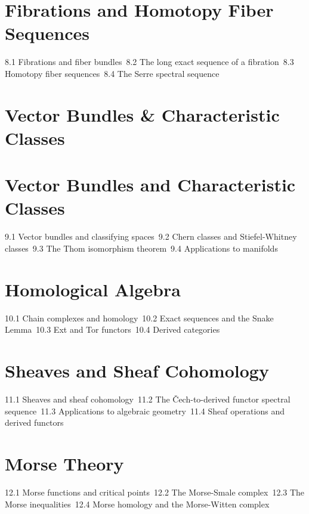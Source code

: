 \section{Fibrations and Homotopy Fiber Sequences}
8.1 Fibrations and fiber bundles\
8.2 The long exact sequence of a fibration\
8.3 Homotopy fiber sequences\
8.4 The Serre spectral sequence\
\section{Vector Bundles \& Characteristic Classes}
\section{Vector Bundles and Characteristic Classes}
9.1 Vector bundles and classifying spaces\
9.2 Chern classes and Stiefel-Whitney classes\
9.3 The Thom isomorphism theorem\
9.4 Applications to manifolds\
\section{Homological Algebra}
10.1 Chain complexes and homology\
10.2 Exact sequences and the Snake Lemma\
10.3 Ext and Tor functors\
10.4 Derived categories\
\section{Sheaves and Sheaf Cohomology}
11.1 Sheaves and sheaf cohomology\
11.2 The Čech-to-derived functor spectral sequence\
11.3 Applications to algebraic geometry\
11.4 Sheaf operations and derived functors\
\section{Morse Theory}
12.1 Morse functions and critical points\
12.2 The Morse-Smale complex\
12.3 The Morse inequalities\
12.4 Morse homology and the Morse-Witten complex\
